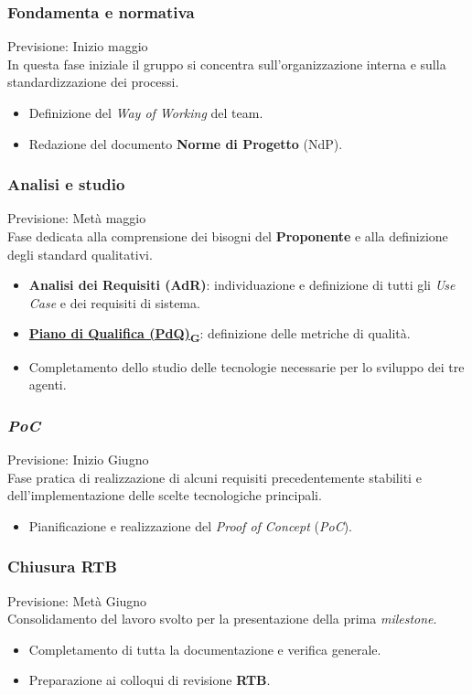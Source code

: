 \documentclass[12pt, a4paper]{article}
\newcommand{\urlglossario}{https://skynetunigroup.github.io/Code_Guardian/Documentazione/PB/glossario_v2.0.0.pdf} %
\newcommand{\glo}[2]{\href{\urlglossario\#nameddest=#2}{#1\textsubscript{G}}}
\begin{document}
{\subsubsection{Fondamenta e normativa}
Previsione: Inizio maggio \\
In questa fase iniziale il gruppo si concentra sull'organizzazione interna e sulla standardizzazione dei processi.
\begin{itemize}
    \item Definizione del \textit{Way of Working} del team.
    \item Redazione del documento \textbf{Norme di Progetto} (NdP).
\end{itemize}


\subsubsection{Analisi e studio}
Previsione: Metà maggio \\
Fase dedicata alla comprensione dei bisogni del \textbf{Proponente} e alla definizione degli standard qualitativi.
\begin{itemize}
    \item \textbf{Analisi dei Requisiti (AdR)}: individuazione e definizione di tutti gli \textit{Use Case} e dei requisiti di sistema.
    \item \textbf{\glo{Piano di Qualifica (PdQ)}{piano-di-qualifica}}: definizione delle metriche di qualità.
    \item Completamento dello studio delle tecnologie necessarie per lo sviluppo dei tre agenti.
\end{itemize}



\subsubsection{\textit{PoC}}
Previsione: Inizio Giugno \\
Fase pratica di realizzazione di alcuni requisiti precedentemente stabiliti e dell'implementazione delle scelte tecnologiche principali.
\begin{itemize}
    \item Pianificazione e realizzazione del \textit{Proof of Concept} (\textit{PoC}).
\end{itemize}

\subsubsection{Chiusura \textbf{RTB}}
Previsione: Metà Giugno \\
Consolidamento del lavoro svolto per la presentazione della prima \textit{milestone}.
\begin{itemize}
    \item Completamento di tutta la documentazione e verifica generale.
\item Preparazione ai colloqui di revisione \textbf{RTB}.
\end{itemize}


}
\end{document}
